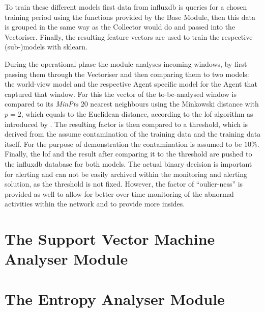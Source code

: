 To train these different models first data from \gls{influxdb} is queries for a chosen training period using the functions provided by the Base Module, then this data is grouped in the same way as the Collector would do and passed into the Vectoriser.
Finally, the resulting feature vectors are used to train the respective (sub-)models with \gls{sklearn}.

During the operational phase the module analyses incoming windows, by first passing them through the Vectoriser and then comparing them to two models: the world-view model and the respective Agent specific model for the Agent that captured that window.
For this the vector of the to-be-analysed window is compared to its \emph{MinPts} 20 nearest neighbours using the Minkowski distance with $p=2$, which equals to the Euclidean distance, according to the \gls{lof} algorithm as introduced by \textcite{Breunig2000}.
The resulting factor is then compared to a threshold, which is derived from the assume contamination of the training data and the training data itself. For the purpose of demonstration the contamination is assumed to be $10\%$.
Finally, the \gls{lof} and the result after comparing it to the threshold are pushed to the \gls{influxdb} database for both models.
The actual binary decision is important for alerting and can not be easily archived within the monitoring and alerting solution, as the threshold is not fixed.
However, the factor of \enquote{oulier-ness} is provided as well to allow for better over time monitoring of the abnormal activities within the network and to provide more insides.

\section{The Support Vector Machine Analyser Module}
\label{sec:impl:svm}

\section{The Entropy Analyser Module}
\label{sec:impl:entropy}
